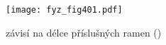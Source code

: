   \begin{figure}[ht!] %
    \centering
    \texttt{[image: fyz\_fig401.pdf]}
    \caption{ závisí na délce příslušných ramen
             (\cite[s.~10000]{Feynman01})}
    \label{fyz_fig401}
  \end{figure}
  
\printbibliography[title={Seznam literatury}, heading=subbibliography]
